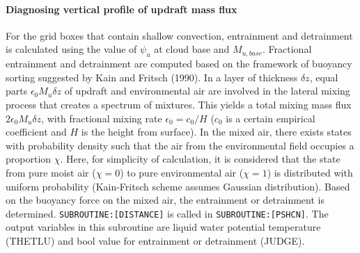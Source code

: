 \paragraph{Diagnosing vertical profile of updraft mass flux}\label{diagnosing-vertical-profile-of-updraft-mass-flux}

For the grid boxes that contain shallow convection, entrainment and detrainment is calculated using the value of $\psi_u$ at cloud base and $M_{u,base}$.
Fractional entrainment and detrainment are computed based on the framework of buoyancy sorting suggested by Kain and Fritsch (1990).
In a layer of thickness $\delta z$, equal parts $\epsilon_0 M_u \delta z$ of updraft and environmental air are involved in the lateral mixing process that creates a spectrum of mixtures.
This yields a total mixing mass flux $2\epsilon_0 M_u \delta z$, with fractional mixing rate $\epsilon_0=c_0/H$ ($c_0$ is a certain empirical coefficient and $H$ is the height from surface).
In the mixed air, there exists states with probability density such that the air from the environmental field occupies a proportion $\chi$. Here, for simplicity of calculation,
it is considered that the state from pure moist air ($\chi=0$) to pure environmental air ($\chi=1$) is distributed with uniform probability (Kain-Fritsch scheme assumes Gaussian distribution).
Based on the buoyancy force on the mixed air, the entrainment or detrainment is determined. \texttt{SUBROUTINE:[DISTANCE]} is called in \texttt{SUBROUTINE:[PSHCN]}.
The output variables in this subroutine are liquid water potential temperature (THETLU) and bool value for entrainment or detrainment (JUDGE).

